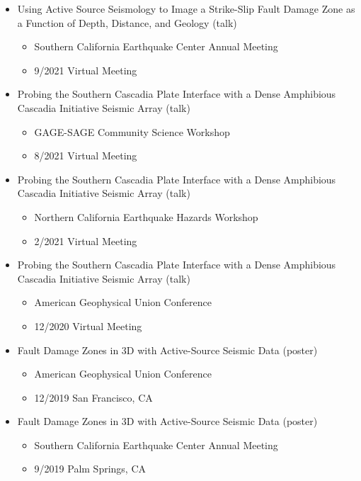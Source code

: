 \documentclass[11pt]{article}
\begin{document}
\begin{itemize}
\item Using Active Source Seismology to Image a Strike-Slip Fault Damage Zone as a Function of Depth, Distance, and Geology (talk)
\begin{itemize}
\item Southern California Earthquake Center Annual Meeting
\item 9/2021 Virtual Meeting
\end{itemize}

\item Probing the Southern Cascadia Plate Interface with a Dense Amphibious Cascadia Initiative Seismic Array (talk)
\begin{itemize}
\item GAGE-SAGE Community Science Workshop
\item 8/2021 Virtual Meeting
\end{itemize}

\item Probing the Southern Cascadia Plate Interface with a Dense Amphibious Cascadia Initiative Seismic Array (talk)
\begin{itemize}
\item Northern California Earthquake Hazards Workshop
\item 2/2021 Virtual Meeting
\end{itemize}

\item Probing the Southern Cascadia Plate Interface with a Dense Amphibious Cascadia Initiative Seismic Array (talk)
\begin{itemize}
\item American Geophysical Union Conference
\item 12/2020 Virtual Meeting
\end{itemize}

\item Fault Damage Zones in 3D with Active-Source Seismic Data (poster)
\begin{itemize}
\item American Geophysical Union Conference
\item 12/2019 San Francisco, CA
\end{itemize}

\item Fault Damage Zones in 3D with Active-Source Seismic Data (poster)
\begin{itemize}
\item Southern California Earthquake Center Annual Meeting
\item 9/2019 Palm Springs, CA
\end{itemize}


\end{itemize}
\end{document}
